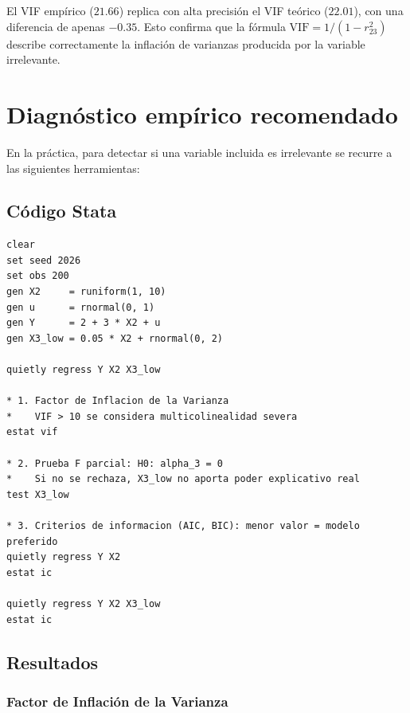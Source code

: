 \documentclass[12pt, letterpaper]{article}
\begin{document}
\begin{clave}
  El VIF empírico ($21.66$) replica con alta precisión el VIF teórico
  ($22.01$), con una diferencia de apenas $-0.35$. Esto confirma que la
  fórmula $\mathrm{VIF} = 1/(1 - r_{23}^2)$ describe correctamente la
  inflación de varianzas producida por la variable irrelevante.
\end{clave}

\section{Diagnóstico empírico recomendado}

En la práctica, para detectar si una variable incluida es irrelevante se
recurre a las siguientes herramientas:

\subsection{Código Stata}

\begin{lstlisting}[caption={Diagnóstico: VIF, prueba F parcial y criterios de información}]
clear
set seed 2026
set obs 200
gen X2     = runiform(1, 10)
gen u      = rnormal(0, 1)
gen Y      = 2 + 3 * X2 + u
gen X3_low = 0.05 * X2 + rnormal(0, 2)

quietly regress Y X2 X3_low

* 1. Factor de Inflacion de la Varianza
*    VIF > 10 se considera multicolinealidad severa
estat vif

* 2. Prueba F parcial: H0: alpha_3 = 0
*    Si no se rechaza, X3_low no aporta poder explicativo real
test X3_low

* 3. Criterios de informacion (AIC, BIC): menor valor = modelo preferido
quietly regress Y X2
estat ic

quietly regress Y X2 X3_low
estat ic
\end{lstlisting}

\subsection{Resultados}

\subsubsection{Factor de Inflación de la Varianza}
\end{document}
